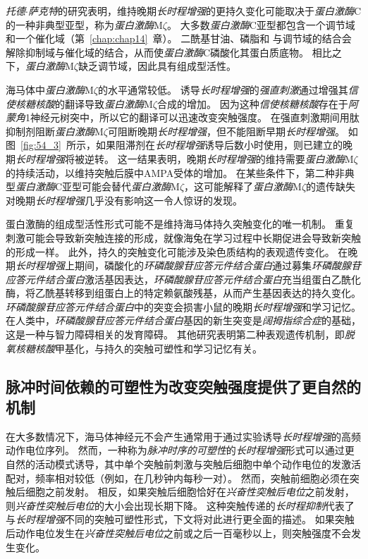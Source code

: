 \textit{托德$\cdot$萨克特}的研究表明，维持晚期\textit{长时程增强}的更持久变化可能取决于\textit{蛋白激酶}C的一种非典型亚型，称为\textit{蛋白激酶}M$\zeta$。
大多数\textit{蛋白激酶}C亚型都包含一个调节域和一个催化域（第~\ref{chap:chap14}~章）。
二酰基甘油、磷脂和  与调节域的结合会解除抑制域与催化域的结合，从而使\textit{蛋白激酶}C磷酸化其蛋白质底物。
相比之下，\textit{蛋白激酶}M$\zeta$缺乏调节域，因此具有组成型活性。


海马体中\textit{蛋白激酶}M$\zeta$的水平通常较低。
诱导\textit{长时程增强}的\textit{强直刺激}通过增强其\textit{信使核糖核酸}的翻译导致\textit{蛋白激酶}M$\zeta$合成的增加。
因为这种\textit{信使核糖核酸}存在于\textit{阿蒙角}1神经元树突中，所以它的翻译可以迅速改变突触强度。
在强直刺激期间用肽抑制剂阻断\textit{蛋白激酶}M$\zeta$可阻断晚期\textit{长时程增强}，但不能阻断早期\textit{长时程增强}。
如图~\ref{fig:54_3}~所示，如果阻滞剂在\textit{长时程增强}诱导后数小时使用，则已建立的晚期\textit{长时程增强}将被逆转。
这一结果表明，晚期\textit{长时程增强}的维持需要\textit{蛋白激酶}M$\zeta$的持续活动，以维持突触后膜中AMPA受体的增加。
在某些条件下，第二种非典型\textit{蛋白激酶}C亚型可能会替代\textit{蛋白激酶}M$\zeta$，这可能解释了\textit{蛋白激酶}M$\zeta$的遗传缺失对晚期\textit{长时程增强}几乎没有影响这一令人惊讶的发现。


蛋白激酶的组成型活性形式可能不是维持海马体持久突触变化的唯一机制。
重复刺激可能会导致新突触连接的形成，就像海兔在学习过程中长期促进会导致新突触的形成一样。
此外，持久的突触变化可能涉及染色质结构的表观遗传变化。
在晚期\textit{长时程增强}上期间，磷酸化的\textit{环磷酸腺苷应答元件结合蛋白}通过募集\textit{环磷酸腺苷应答元件结合蛋白}激活基因表达，\textit{环磷酸腺苷应答元件结合蛋白}充当组蛋白乙酰化酶，将乙酰基转移到组蛋白上的特定赖氨酸残基，从而产生基因表达的持久变化。
\textit{环磷酸腺苷应答元件结合蛋白}中的突变会损害小鼠的晚期\textit{长时程增强}和学习记忆。
在人类中，\textit{环磷酸腺苷应答元件结合蛋白}基因的新生突变是\textit{阔拇指综合症}的基础，这是一种与智力障碍相关的发育障碍。
其他研究表明第二种表观遗传机制，即\textit{脱氧核糖核酸}甲基化，与持久的突触可塑性和学习记忆有关。



\subsection{脉冲时间依赖的可塑性为改变突触强度提供了更自然的机制}

在大多数情况下，海马体神经元不会产生通常用于通过实验诱导\textit{长时程增强}的高频动作电位序列。
然而，一种称为\textit{脉冲时序的可塑性}的\textit{长时程增强}形式可以通过更自然的活动模式诱导，其中单个突触前刺激与突触后细胞中单个动作电位的发激活配对，频率相对较低（例如，在几秒钟内每秒一对）。
然而，突触前细胞必须在突触后细胞之前发射。
相反，如果突触后细胞恰好在\textit{兴奋性突触后电位}之前发射，则\textit{兴奋性突触后电位}的大小会出现长期下降。
这种突触传递的\textit{长时程抑制}代表了与\textit{长时程增强}不同的突触可塑性形式，下文将对此进行更全面的描述。
如果突触后动作电位发生在\textit{兴奋性突触后电位}之前或之后一百毫秒以上，则突触强度不会发生变化。


